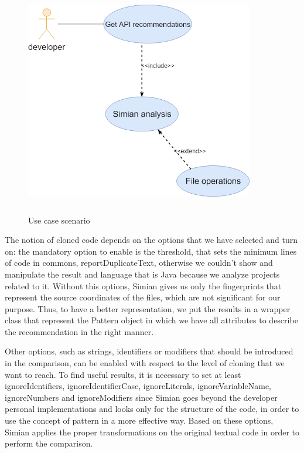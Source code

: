 \begin{figure}[!h]
	\includegraphics[width=10cm,height=10cm,keepaspectratio]{images/Usecase.png}
	\centering
	\caption{Use case scenario}
	\label{fig:UseCaseScenario}
\end{figure}



The notion of cloned code depends on the options that we have selected and turn on: the mandatory option to enable is the threshold, that sets the minimum lines of code in commons, reportDuplicateText, otherwise we couldn't show and manipulate the result and language that is Java because we analyze projects related to it. Without this options, Simian gives us only the fingerprints that represent the source coordinates of the files, which are not significant for our purpose. Thus, to have a better representation, we put the results in a wrapper class that represent the Pattern object in which we have all attributes to describe the recommendation in the right manner.

Other options, such as strings, identifiers or modifiers that should be introduced in the comparison, can be enabled with respect to the level of cloning that we want to reach. To find useful results, it is necessary to set at least ignoreIdentifiers, ignoreIdentifierCase, ignoreLiterals, ignoreVariableName, ignoreNumbers and ignoreModifiers since Simian goes beyond the developer personal implementations and looks only for the structure of the code, in order to use the concept of pattern in a more effective way. Based on these options, Simian applies the proper transformations on the original textual code in order to perform the comparison. 

